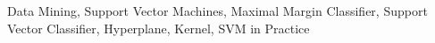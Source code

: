 \begin{keywords}
    Data Mining,
    Support Vector Machines,
    Maximal Margin Classifier,
    Support Vector Classifier,
    Hyperplane,
    Kernel,
    SVM in Practice
\end{keywords}